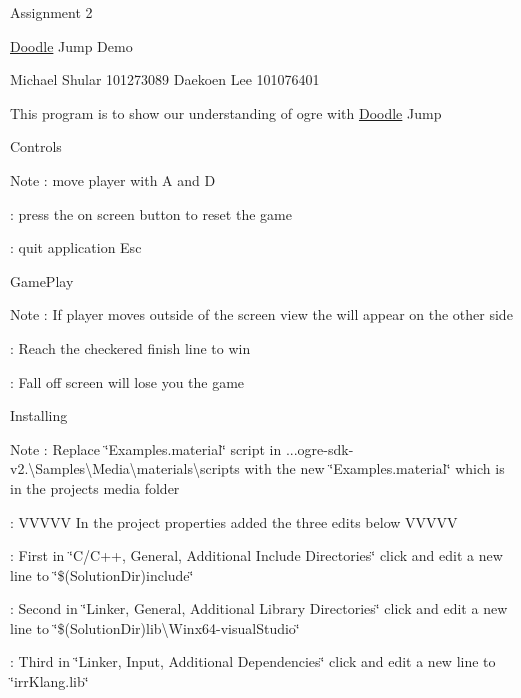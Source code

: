 Assignment 2

\mbox{\hyperlink{class_doodle}{Doodle}} Jump Demo

Michael Shular 101273089 Daekoen Lee 101076401

This program is to show our understanding of ogre with \mbox{\hyperlink{class_doodle}{Doodle}} Jump

Controls \begin{DoxyNote}{Note}
\+: move player with A and D 

\+: press the on screen button to reset the game 

\+: quit application Esc
\end{DoxyNote}
Game\+Play \begin{DoxyNote}{Note}
\+: If player moves outside of the screen view the will appear on the other side 

\+: Reach the checkered finish line to win 

\+: Fall off screen will lose you the game
\end{DoxyNote}
Installing \begin{DoxyNote}{Note}
\+: Replace \char`\"{}\+Examples.\+material\char`\"{} script in ...ogre-\/sdk-\/v2.\textbackslash{}\+Samples\textbackslash{}\+Media\textbackslash{}materials\textbackslash{}scripts with the new \char`\"{}\+Examples.\+material\char`\"{} which is in the project\textquotesingle{}s media folder 

\+: VVVVV In the project properties added the three edits below VVVVV 

\+: First in \char`\"{}\+C/\+C++, General, Additional Include Directories\char`\"{} click and edit a new line to \char`\"{}\$(\+Solution\+Dir)include\char`\"{} 

\+: Second in \char`\"{}\+Linker, General, Additional Library Directories\char`\"{} click and edit a new line to \char`\"{}\$(\+Solution\+Dir)lib\textbackslash{}\+Winx64-\/visual\+Studio\char`\"{} 

\+: Third in \char`\"{}\+Linker, Input, Additional Dependencies\char`\"{} click and edit a new line to \char`\"{}irr\+Klang.\+lib\char`\"{} 
\end{DoxyNote}
